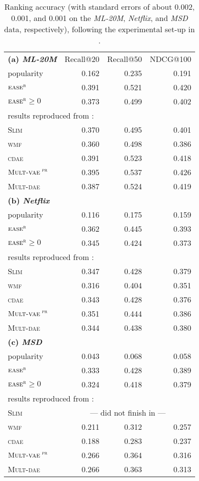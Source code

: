 \documentclass[sigconf]{acmart}
\newcommand{\slim}{{\scshape Slim}}
\newcommand{\wmf}{{\scshape wmf}}
\newcommand{\cdae}{{\scshape cdae}}
\newcommand{\mvae}{${\textsc{Mult-vae}}^{\textsc{ pr}}$}
\newcommand{\mdae}{{\scshape Mult-dae}}
\newcommand{\sae}{${\textsc{ease}}^{\textsc{r}}$}
\begin{document}
\begin{table}
\caption{Ranking accuracy (with standard errors of about 0.002, 0.001, and 0.001 on the \emph{ML-20M}, \emph{Netflix}, and \emph{MSD} data, respectively), following the experimental set-up in \cite{liang18}.}
\label{tab_dawen}
\begin{tabular}{lrrr}
\hline
{\bf(a)\emph{ ML-20M}}  &   Recall@20    &    Recall@50    &    NDCG@100\\
popularity    &    0.162    &    0.235    &   0.191 \\
\sae{}     &    0.391    &    0.521    &   0.420 \\
\sae{}$\ge 0$    &  0.373    &  0.499  &  0.402\\
\multicolumn{4}{l}{ results reproduced from \cite{liang18}:}\\
\slim{}    &    0.370    &    0.495    &    0.401\\
\wmf{}     &    0.360    &    0.498    &    0.386\\
\cdae{}     &    0.391    &    0.523    &    0.418\\
\mvae{}     &    0.395    &    0.537    &    0.426\\
\mdae{}     &    0.387    &    0.524    &    0.419\\
\hline
{\bf (b) \emph{Netflix}}&& &\\
popularity    &    0.116    &    0.175    &   0.159 \\
\sae{}     &    0.362    &    0.445    &   0.393 \\
\sae{}$\ge 0$    &  0.345    &  0.424  &  0.373\\
\multicolumn{4}{l}{ results reproduced from \cite{liang18}:}\\
\slim{}    &    0.347    &    0.428    &    0.379\\
\wmf{}     &    0.316    &    0.404    &    0.351\\
\cdae{}     &    0.343    &    0.428    &    0.376\\
\mvae{}     &    0.351    &    0.444    &    0.386\\
\mdae{}     &    0.344    &    0.438    &    0.380\\
\hline
{\bf (c)     \emph{MSD}}& & &\\
popularity    &    0.043    &    0.068    &   0.058 \\
\sae{}     &    0.333    &    0.428    &   0.389 \\
\sae{}$\ge 0$    &  0.324    &  0.418  &  0.379\\
\multicolumn{4}{l}{ results reproduced from \cite{liang18}: }\\
\slim{}    &    \multicolumn{3}{c}{--- did not finish in \cite{liang18} ---}     \\
\wmf{}     &    0.211    &    0.312    &    0.257\\
\cdae{}     &    0.188    &    0.283    &    0.237\\
\mvae{}     &    0.266    &    0.364    &    0.316\\
\mdae{}     &    0.266    &    0.363    &    0.313\\
\hline
\end{tabular}
\end{table}
\end{document}
